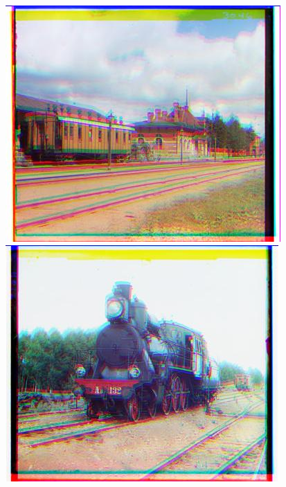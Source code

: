 \documentclass[12pt]{article}
\begin{document}
\begin{center}
\includegraphics[scale=0.6]{processed/processed-128-00398v.jpg}~
\includegraphics[scale=0.6]{processed/processed-128-00458v.jpg}
\end{center}
\end{document}

